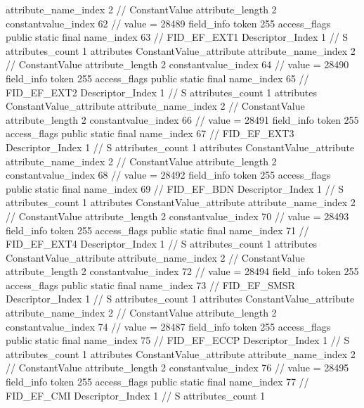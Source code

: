 {{{{{{{					attribute_name_index	2		// ConstantValue
					attribute_length	2
					constantvalue_index	62		// value = 28489
				}
				}
			}
			field_info {
				token	255
				access_flags	public static final
				name_index	63		// FID_EF_EXT1
				Descriptor_Index	1		// S
				attributes_count	1
				attributes {
				ConstantValue_attribute {
					attribute_name_index	2		// ConstantValue
					attribute_length	2
					constantvalue_index	64		// value = 28490
				}
				}
			}
			field_info {
				token	255
				access_flags	public static final
				name_index	65		// FID_EF_EXT2
				Descriptor_Index	1		// S
				attributes_count	1
				attributes {
				ConstantValue_attribute {
					attribute_name_index	2		// ConstantValue
					attribute_length	2
					constantvalue_index	66		// value = 28491
				}
				}
			}
			field_info {
				token	255
				access_flags	public static final
				name_index	67		// FID_EF_EXT3
				Descriptor_Index	1		// S
				attributes_count	1
				attributes {
				ConstantValue_attribute {
					attribute_name_index	2		// ConstantValue
					attribute_length	2
					constantvalue_index	68		// value = 28492
				}
				}
			}
			field_info {
				token	255
				access_flags	public static final
				name_index	69		// FID_EF_BDN
				Descriptor_Index	1		// S
				attributes_count	1
				attributes {
				ConstantValue_attribute {
					attribute_name_index	2		// ConstantValue
					attribute_length	2
					constantvalue_index	70		// value = 28493
				}
				}
			}
			field_info {
				token	255
				access_flags	public static final
				name_index	71		// FID_EF_EXT4
				Descriptor_Index	1		// S
				attributes_count	1
				attributes {
				ConstantValue_attribute {
					attribute_name_index	2		// ConstantValue
					attribute_length	2
					constantvalue_index	72		// value = 28494
				}
				}
			}
			field_info {
				token	255
				access_flags	public static final
				name_index	73		// FID_EF_SMSR
				Descriptor_Index	1		// S
				attributes_count	1
				attributes {
				ConstantValue_attribute {
					attribute_name_index	2		// ConstantValue
					attribute_length	2
					constantvalue_index	74		// value = 28487
				}
				}
			}
			field_info {
				token	255
				access_flags	public static final
				name_index	75		// FID_EF_ECCP
				Descriptor_Index	1		// S
				attributes_count	1
				attributes {
				ConstantValue_attribute {
					attribute_name_index	2		// ConstantValue
					attribute_length	2
					constantvalue_index	76		// value = 28495
				}
				}
			}
			field_info {
				token	255
				access_flags	public static final
				name_index	77		// FID_EF_CMI
				Descriptor_Index	1		// S
				attributes_count	1
}}}}}
